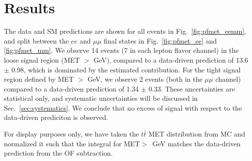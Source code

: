 
\section{Results}
\label{sec:results}

The data and SM predictions are shown for all events in 
Fig.~\ref{fig:pfmet_eemm}, 
and split between the $ee$
and $\mu\mu$ final states in 
Fig.~\ref{fig:pfmet_ee} and \ref{fig:pfmet_mm}. 
We observe 14 events (7 in each lepton flavor channel) 
in the loose signal region (MET $>$ \signalmetl GeV), 
compared to a data-driven prediction of 
13.6 $\pm$ 0.98,
which is dominated by the estimated \ttbar contribution. 
For the tight signal region defined by MET $>$ \signalmett GeV, 
we observe 2 events (both in the $\mu\mu$ channel) compared to a 
data-driven prediction of 
1.34 $\pm$ 0.33.
These uncertainties are statistical only, and systematic uncertainties will be 
discussed in Sec.~\ref{sec:systematics}. We conclude that no excess of signal 
with respect to the data-driven prediciton is observed.

For display purposes only, we have taken the
$t\bar{t}$ MET distribution from MC and normalized it such that the integral for 
MET$>$\signalmetl~GeV matches the data-driven prediction
from the OF subtraction. 



\newcommand{\resultcaption}[1]{
      The observed MET distribution for data in the #1 channels (black points),
      predicted $t\bar{t}$ MET distribution (red line), the sum of predicted 
	  $t\bar{t}$ MET distribution and
      Z  MET  distribution  predicted  from photon  MET  templates
      (solid blue line),  and MC stacked for dominant backgrounds. 
	  Below the  plot is  tabulated the  integral  of the
      predicted  MET distribution  using the  MET templates  method (Z
      pred),  the  predicted ttbar  yield  using  the opposite  flavor
      subtraction  technique (OFOS), the  sum of  these two
      contributions (Z pred + OFOS), and the observed MET distribution
      (data), for MET $>$ 30~GeV and $>$ 60~GeV (which are shown as cross
	  checks), and for the signal regions of MET $>$ 100~GeV and $>$ 200~GeV. 
}

